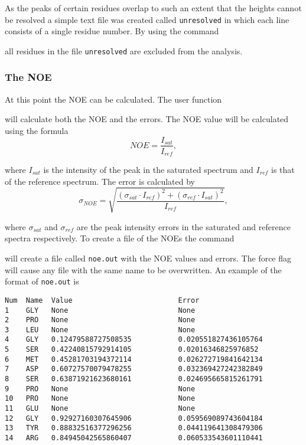 As the peaks of certain residues overlap to such an extent that the heights cannot be resolved a simple text file was created called \texttt{unresolved} in which each line consists of a single residue number.  By using the command


all residues in the file \texttt{unresolved} are excluded from the analysis.


\subsubsection{The NOE}

At this point the NOE can be calculated.  The user function


will calculate both the NOE and the errors.  The NOE value will be calculated using the formula
\begin{equation}
NOE = \frac{I_{sat}}{I_{ref}},
\end{equation}

\noindent where $I_{sat}$ is the intensity of the peak in the saturated spectrum and $I_{ref}$ is that of the reference spectrum.  The error is calculated by
\begin{equation}
\sigma_{NOE} = \sqrt{\frac{(\sigma_{sat} \cdot I_{ref})^2 + (\sigma_{ref} \cdot I_{sat})^2}{I_{ref}}},
\end{equation}

\noindent where $\sigma_{sat}$ and $\sigma_{ref}$ are the peak intensity errors in the saturated and reference spectra respectively.  To create a file of the NOEs the command


will create a file called \texttt{noe.out} with the NOE values and errors.  The force flag will cause any file with the same name to be overwritten.  An example of the format of \texttt{noe.out} is

{\footnotesize \begin{verbatim}
Num  Name  Value                         Error
1    GLY   None                          None
2    PRO   None                          None
3    LEU   None                          None
4    GLY   0.12479588727508535           0.020551827436105764
5    SER   0.42240815792914105           0.02016346825976852
6    MET   0.45281703194372114           0.026272719841642134
7    ASP   0.60727570079478255           0.032369427242382849
8    SER   0.63871921623680161           0.024695665815261791
9    PRO   None                          None
10   PRO   None                          None
11   GLU   None                          None
12   GLY   0.92927160307645906           0.059569089743604184
13   TYR   0.88832516377296256           0.044119641308479306
14   ARG   0.84945042565860407           0.060533543601110441
\end{verbatim}}



